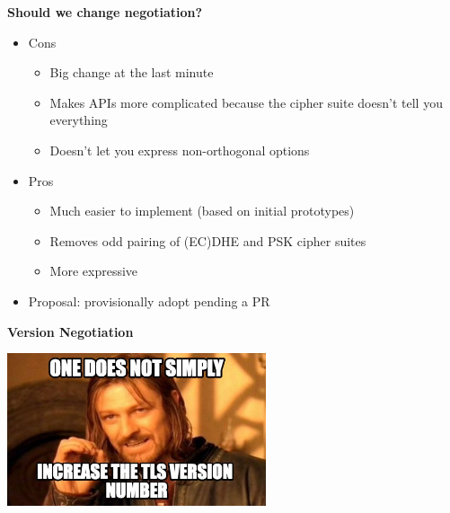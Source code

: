\documentclass[helvetica]{seminar}
\newcommand{\heading}[1]{%
  \begin{center} 
    \large\bf 
    #1 
  \end{center} 
  \vspace{.4 in}}
\begin{document}
\begin{slide}
\heading{Should we change negotiation?}

\begin{itemize}
\item Cons
  \begin{itemize}
  \item Big change at the last minute
  \item Makes APIs more complicated because the cipher suite doesn't tell you everything
  \item Doesn't let you express non-orthogonal options
  \end{itemize}

\item Pros
  \begin{itemize}
  \item Much easier to implement (based on initial prototypes)
  \item Removes odd pairing of (EC)DHE and PSK cipher suites
  \item More expressive
  \end{itemize}

\item Proposal: provisionally adopt pending a PR
\end{itemize}

\end{slide}


\begin{slide}
\heading{Version Negotiation}

\includegraphics[width=3in]{932382}

\end{slide}
\end{document}
